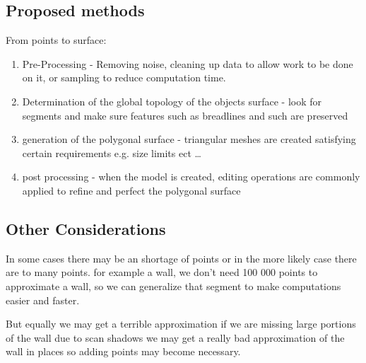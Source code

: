 \subsection{Proposed methods}


From points to surface:

\begin{enumerate}
\item Pre-Processing - Removing noise, cleaning up data to allow work to be done on it, or sampling to reduce computation time.

\item Determination of the global topology of the objects surface - look for segments and make sure features such as breadlines and such are preserved
	
\item generation of the polygonal surface - triangular meshes are created satisfying certain requirements e.g. size limits ect \ldots

\item post processing - when the model is created, editing operations are commonly applied to refine and perfect the polygonal surface
\end{enumerate}

\subsection{Other Considerations}

In some cases there may be an shortage of points or in the more likely case there are to many points. for example a wall, we don't need 100 000 points to approximate a wall, so we can generalize that segment to make computations easier and faster.

But equally we may get a terrible approximation if we are missing large portions of the wall due to scan shadows we may get a really bad approximation of the wall in places so adding points may become necessary.





















